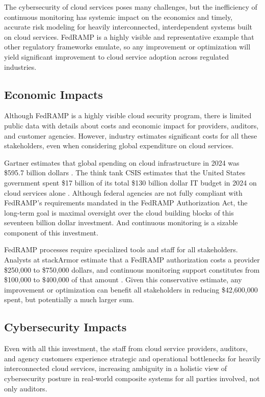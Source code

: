 \documentclass{jdf}
\begin{document}
The cybersecurity of cloud services poses many challenges, but the inefficiency of continuous monitoring has systemic impact on the economics and timely, accurate risk modeling for heavily interconnected, interdependent systems built on cloud services. FedRAMP is a highly visible and representative example that other regulatory frameworks emulate, so any improvement or optimization will yield significant improvement to cloud service adoption across regulated industries.

\subsection{Economic Impacts}

Although FedRAMP is a highly visible cloud security program, there is limited public data with details about costs and economic impact for providers, auditors, and customer agencies. However, industry estimates significant costs for all these stakeholders, even when considering global expenditure on cloud services.

Gartner estimates that global spending on cloud infrastructure in 2024 was \$595.7 billion dollars \citeyear{gartner24}. The think tank CSIS estimates that the United States government spent \$17 billion of its total \$130 billion dollar IT budget in 2024 on cloud services alone \citeyear[p.~1]{csis25}. Although federal agencies are not fully compliant with FedRAMP's requirements mandated in the FedRAMP Authorization Act, the long-term goal is maximal oversight over the cloud building blocks of this seventeen billion dollar investment. And continuous monitoring is a sizable component of this investment.

FedRAMP processes require specialized tools and staff for all stakeholders. Analysts at stackArmor estimate that a FedRAMP authorization costs a provider \$250,000 to \$750,000 dollars, and continuous monitoring support constitutes from \$100,000 to \$400,000 of that amount \citeyear{stackarmor24}. Given this conservative estimate, any improvement or optimization can benefit all stakeholders in reducing \$42,600,000 spent, but potentially a much larger sum.

\subsection{Cybersecurity Impacts}

Even with all this investment, the staff from cloud service providers, auditors, and agency customers experience strategic and operational bottlenecks for heavily interconnected cloud services, increasing ambiguity in a holistic view of cybersecurity posture in real-world composite systems for all parties involved, not only auditors. 
\end{document}

